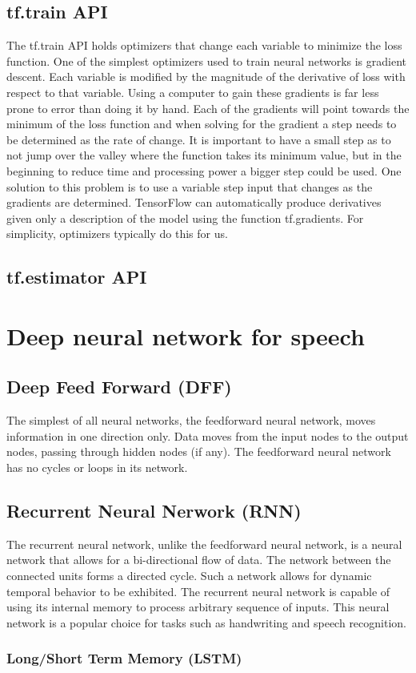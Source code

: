 \subsection{tf.train API}
The tf.train API holds optimizers that change each variable to minimize the loss function. One of the simplest optimizers used to train neural networks is gradient descent. Each variable is modified by the magnitude of the derivative of loss with respect to that variable. Using a computer to gain these gradients is far less prone to error than doing it by hand. Each of the gradients will point towards the minimum of the loss function and when solving for the gradient a step needs to be determined as the rate of change. It is important to  have a small step as to not jump over the valley where the function takes its minimum value, but in the beginning to reduce time and processing power a bigger step could be used. One solution to this problem is to use a variable step input that changes as the gradients are determined. TensorFlow can automatically produce derivatives given only a description of the model using the function tf.gradients. For simplicity, optimizers typically do this for us.
\subsection{tf.estimator API}

\section{Deep neural network for speech}
\subsection{Deep Feed Forward (DFF)}
The simplest of all neural networks, the feedforward neural network, moves information in one direction only. Data moves from the input nodes to the output nodes, passing through hidden nodes (if any). The feedforward neural network has no cycles or loops in its network.

\subsection{Recurrent Neural Nerwork (RNN)}
The recurrent neural network, unlike the feedforward neural network, is a neural network that allows for a bi-directional flow of data. The network between the connected units forms a directed cycle. Such a network allows for dynamic temporal behavior to be exhibited. The recurrent neural network is capable of using its internal memory to process arbitrary sequence of inputs. This neural network is a popular choice for tasks such as handwriting and speech recognition.

\subsubsection{Long/Short Term Memory (LSTM)}
